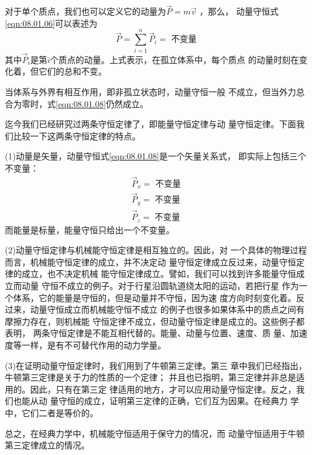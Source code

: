 对于单个质点，我们也可以定义它的动量为$ \vec { P } = m \vec { v } $ ，那么，
动量守恒\lhbrak 式\eqref{eqn:08.01.06}\rhbrak 可以表述为
\begin{equation}\label{eqn:08.01.08}
    \vec { P } = \sum _ { i = 1 } ^ { n } \vec { P } _ { i } = \text { 不变量 }
\end{equation}
其中$ \vec { P } _ { i } $是第$ i $个质点的动量。上式表示，在孤立体系中，每个质点
的动量时刻在变化着，但它们的总和不变。

当体系与外界有相互作用，即非孤立状态时，动量守恒一般
不成立，但当外力总合为零时，式\eqref{eqn:08.01.08}仍然成立。

迄今我们已经研究过两条守恒定律了，即能量守恒定律与动
量守恒定律。下面我们比较一下这两条守恒定律的特点。

(1)动量是矢量，动量守恒\lhbrak 式\eqref{eqn:08.01.08}\rhbrak 是一个矢量关系式，
即实际上包括三个不变量：
\begin{equation}\label{eqn:08.01.09}
    \begin{aligned}
        \vec{ P } _ { x } = \text { 不变量 } \\
        \vec{ P } _ { y } = \text { 不变量 } \\
        \vec{ P } _ { z } = \text { 不变量 }
    \end{aligned}
\end{equation}
而能量是标量，能量守恒只给出一个不变量。

(2)动量守恒定律与机械能守恒定律是相互独立的。因此，对
一个具体的物理过程而言，机械能守恒定律的成立，并不决定动
量守恒定律成立反过来，动量守恒定律的成立，也不决定机械
能守恒定律成立。譬如，我们可以找到许多能量守恒成立而动量
守恒不成立的例子。对于行星沿圆轨道绕太阳的运动，若把行星
作为一个体系，它的能量是守恒的，但是动量并不守恒，因为速
度方向时刻变化着。反过来，动量守恒成立而机械能守恒不成立
的例子也很多如果体系中的质点之间有摩擦力存在，则机械能
守恒定律不成立，但动量守恒定律是成立的。这些例子都表明，
两条守恒定律是不能互相代替的。能量、动量与位置、速度、质
量、加速度等一样，是有不可替代作用的动力学量。

(3)在证明动量守恒定律时，我们用到了牛顿第三定律。第三
章中我们已经指出，牛顿第三定律是关于力的性质的一个定律；
并且也已指明，第三定律并非总是适用的。因此，只有在第三定
律适用的地方，才可以应用动量守恒定律。反之，我们也能从动
量守恒的成立，证明第三定律的正确，它们互为因果。在经典力
学中，它们二者是等价的。

总之，在经典力学中，机械能守恒适用于保守力的情况，而
动量守恒适用于牛顿第三定律成立的情况。
